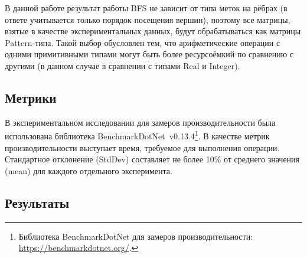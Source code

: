 \begin{table}
\begin{center}
\caption{Разреженные матричные данные}
\label{tbl:matrices}
\end{center}
\end{table}

В данной работе результат работы BFS не зависит от типа меток на рёбрах (в ответе учитывается только порядок посещения вершин), поэтому все матрицы, взятые в качестве экспериментальных данных, будут обрабатываться как матрицы Pattern-типа. Такой выбор обусловлен тем, что арифметические операции с одними примитивными типами могут быть более ресурсоёмкий по сравнению с другими (в данном случае в сравнении с типами Real и Integer).

\subsection{Метрики}

В экспериментальном исследовании для замеров производительности была использована библиотека Bench\-mark\-Dot\-Net~v0.13.4\footnote{Библиотека BenchmarkDotNet для замеров производительности: \url{https://benchmarkdotnet.org/}.}. В качестве метрик производительности выступает время, требуемое для выполнения операции. Стандартное отклонение (StdDev) составляет не более 10\% от среднего значения (mean) для каждого отдельного эксперимента.

\subsection{Результаты}

